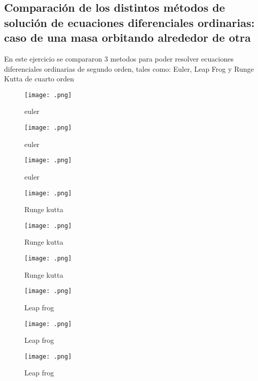 \documentclass[a4paper]{article}
\begin{document}
\subsection{Comparación de los distintos métodos de solución de ecuaciones diferenciales ordinarias: caso de una masa orbitando alrededor de otra}
En este ejercicio se compararon 3 metodos para poder resolver ecuaciones diferenciales ordinarias de segundo orden, tales como: Euler, Leap Frog y Runge Kutta de cuarto orden 

\begin{figure}[H]
\texttt{[image: .png]}
\caption{euler }
\centering
\end{figure}

\begin{figure}[H]
\texttt{[image: .png]}
\caption{euler }
\centering
\end{figure}

\begin{figure}[H]
\texttt{[image: .png]}
\caption{euler }
\centering
\end{figure}

\begin{figure}[H]
\texttt{[image: .png]}
\caption{Runge kutta }
\centering
\end{figure}

\begin{figure}[H]
\texttt{[image: .png]}
\caption{Runge kutta }
\centering
\end{figure}

\begin{figure}[H]
\texttt{[image: .png]}
\caption{Runge kutta }
\centering
\end{figure}

\begin{figure}[H]
\texttt{[image: .png]}
\caption{Leap frog }
\centering
\end{figure}

\begin{figure}[H]
\texttt{[image: .png]}
\caption{Leap frog }
\centering
\end{figure}

\begin{figure}[H]
\texttt{[image: .png]}
\caption{Leap frog }
\centering
\end{figure}
\end{document}
